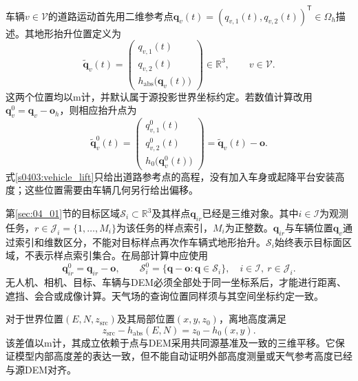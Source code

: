 车辆$v\in\mathcal V$的道路运动首先用二维参考点$\mathbf q_v(t)=(q_{v,1}(t),q_{v,2}(t))^{\mathsf T}\in\Omega_h$描述。其地形抬升位置定义为
\begin{equation}
 \widetilde{\mathbf q}_v(t)
 =\begin{pmatrix}
 q_{v,1}(t)\\q_{v,2}(t)\\h_{\mathrm{abs}}\bigl(\mathbf q_v(t)\bigr)
 \end{pmatrix}\in\mathbb R^3,
 \qquad v\in\mathcal V.
 \label{s0403:vehicle_lift}
\end{equation}
这两个位置均以$\mathrm m$计，并默认属于源投影世界坐标约定。若数值计算改用$\mathbf q_v^0=\mathbf q_v-\mathbf o_h$，则相应抬升点为
\begin{equation}
 \widetilde{\mathbf q}_v^0(t)
 =\begin{pmatrix}
 q_{v,1}^0(t)\\q_{v,2}^0(t)\\h_0\bigl(\mathbf q_v^0(t)\bigr)
 \end{pmatrix}
 =\widetilde{\mathbf q}_v(t)-\mathbf o.
 \label{s0403:vehicle_local_lift}
\end{equation}
式\eqref{s0403:vehicle_lift}只给出道路参考点的高程，没有加入车身或起降平台安装高度；这些位置需要由车辆几何另行给出偏移。

第\ref{sec:04_01}节的目标区域$\mathcal S_i\subset\mathbb R^3$及其样点$\mathbf q_{ir}$已经是三维对象。其中$i\in\mathcal I$为观测任务，$r\in\mathcal J_i=\{1,\ldots,M_i\}$为该任务的样点索引，$M_i$为正整数。$\mathbf q_{ir}$与车辆位置$\mathbf q_v$通过索引和维数区分，不能对目标样点再次作车辆式地形抬升。$\mathcal S_i$始终表示目标面区域，不表示样点索引集合。在局部计算中应使用
\begin{equation}
 \mathbf q_{ir}^0=\mathbf q_{ir}-\mathbf o,
 \qquad
 \mathcal S_i^0=\{\mathbf q-\mathbf o:\mathbf q\in\mathcal S_i\},
 \quad i\in\mathcal I,\ r\in\mathcal J_i.
 \label{s0403:local_targets}
\end{equation}
无人机、相机、目标、车辆与DEM必须全部处于同一坐标系后，才能进行距离、遮挡、会合或成像计算。天气场的查询位置同样须与其空间坐标约定一致。

对于世界位置$(E,N,z_{\mathrm{src}})$及其局部位置$(x,y,z_0)$，离地高度满足
\begin{equation}
 z_{\mathrm{src}}-h_{\mathrm{abs}}(E,N)
 =z_0-h_0(x,y).
 \label{s0403:height_translation}
\end{equation}
该差值以$\mathrm m$计，其成立依赖于点与DEM采用共同源基准及一致的三维平移。它保证模型内部高度差的表达一致，但不能自动证明外部高度测量或天气参考高度已经与源DEM对齐。

